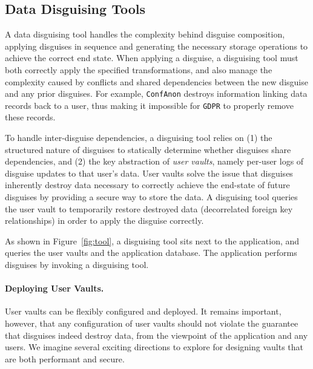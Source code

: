 \subsection{Data Disguising Tools}
\label{sec:composition}

A data disguising tool handles the complexity behind disguise composition, applying disguises in
sequence and generating the necessary storage operations to achieve the correct end state.
When applying a disguise, a disguising tool must both correctly apply the specified transformations, and also
manage the complexity caused by conflicts and shared dependencies between the new disguise and any
prior disguises.  For example, \texttt{ConfAnon} destroys information linking data records back to a
user, thus making it impossible for \texttt{GDPR} to properly remove these records.

To handle inter-disguise dependencies, a disguising tool relies on (1) the structured nature of disguises to
statically determine whether disguises share dependencies, and (2) the key abstraction of \emph{user
vaults}, namely per-user logs of disguise updates to that user's data.  User vaults solve the issue
that disguises inherently destroy data necessary to correctly achieve the end-state of future
disguises by providing a secure way to store the data. A disguising tool queries the user vault to
temporarily restore destroyed data (\eg decorrelated foreign key relationships) in order to apply
the disguise correctly.

As shown in Figure~\ref{fig:tool}, a disguising tool sits next to the application, and queries the
user vaults and the application database. The application performs disguises by invoking a
disguising tool.

\paragraph{Deploying User Vaults.}
User vaults can be flexibly configured and deployed. It remains important, however, that any
configuration of user vaults should not violate the guarantee that disguises indeed destroy data,
from the viewpoint of the application and any users.
We imagine several exciting directions to explore for designing vaults that are both
performant and secure.
%

